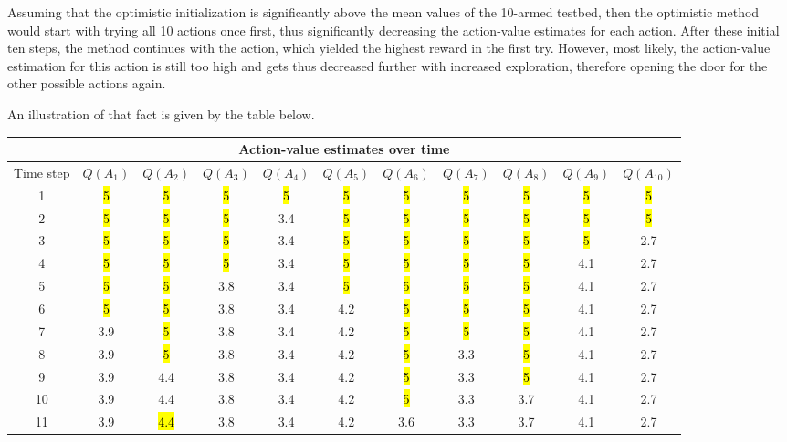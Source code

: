 \begin{solution}

Assuming that the optimistic initialization is significantly above the mean values
of the 10-armed testbed, then the optimistic method would start with trying all 10
actions once first, thus significantly decreasing the action-value estimates for each action.
After these initial ten steps, the method continues with the action, which yielded
the highest reward in the first try. However, most likely, the action-value estimation
for this action is still too high and gets thus decreased further with increased exploration,
therefore opening the door for the other possible actions again.

An illustration of that fact is given by the table below.

\begin{center}
\begin{tabular}{ |c||c|c|c|c|c|c|c|c|c|c| }
 \hline
 \multicolumn{11}{|c|}{Action-value estimates over time} \\
 \hline
 Time step & $Q(A_1)$ & $Q(A_2)$ & $Q(A_3)$ & $Q(A_4)$ & $Q(A_5)$ & $Q(A_6)$ & $Q(A_7)$ & $Q(A_8)$ & $Q(A_9)$ & $Q(A_10)$ \\
 \hline
 1 & \hl{5} & \hl{5} & \hl{5} & \hl{5} & \hl{5} & \hl{5} & \hl{5} & \hl{5} & \hl{5} & \hl{5} \\
 2 & \hl{5} & \hl{5} & \hl{5} & 3.4 & \hl{5} & \hl{5} & \hl{5} & \hl{5} & \hl{5} & \hl{5} \\
 3 & \hl{5} & \hl{5} & \hl{5} & 3.4 & \hl{5} & \hl{5} & \hl{5} & \hl{5} & \hl{5} & 2.7 \\
 4 & \hl{5} & \hl{5} & \hl{5} & 3.4 & \hl{5} & \hl{5} & \hl{5} & \hl{5} & 4.1 & 2.7 \\
 5 & \hl{5} & \hl{5} & 3.8 & 3.4 & \hl{5} & \hl{5} & \hl{5} & \hl{5} & 4.1 & 2.7 \\
 6 & \hl{5} & \hl{5} & 3.8 & 3.4 & 4.2 & \hl{5} & \hl{5} & \hl{5} & 4.1 & 2.7 \\
 7 & 3.9 & \hl{5} & 3.8 & 3.4 & 4.2 & \hl{5} & \hl{5} & \hl{5} & 4.1 & 2.7 \\
 8 & 3.9 & \hl{5} & 3.8 & 3.4 & 4.2 & \hl{5} & 3.3 & \hl{5} & 4.1 & 2.7 \\
 9 & 3.9 & 4.4 & 3.8 & 3.4 & 4.2 & \hl{5} & 3.3 & \hl{5} & 4.1 & 2.7 \\
 10 & 3.9 & 4.4 & 3.8 & 3.4 & 4.2 & \hl{5} & 3.3 & 3.7 & 4.1 & 2.7 \\
 11 & 3.9 & \hl{4.4} & 3.8 & 3.4 & 4.2 & 3.6 & 3.3 & 3.7 & 4.1 & 2.7 \\
 \hline
\end{tabular}
\end{center}


\end{solution}

